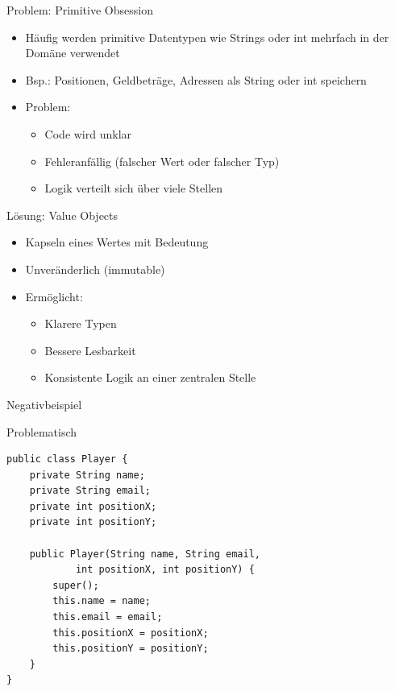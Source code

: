 \begin{frame}{Problem: Primitive Obsession}
    \begin{itemize}
        \item Häufig werden primitive Datentypen wie Strings oder int mehrfach in der Domäne verwendet
        \item Bsp.: Positionen, Geldbeträge, Adressen als String oder int speichern
        \item Problem:
        \begin{itemize}
            \item Code wird unklar
            \item Fehleranfällig (falscher Wert oder falscher Typ)
            \item Logik verteilt sich über viele Stellen
        \end{itemize}
    \end{itemize}
\end{frame}

\begin{frame}{Lösung: Value Objects}
    \begin{itemize}
        \item Kapseln eines Wertes mit Bedeutung
        \item Unveränderlich (immutable)
        \item Ermöglicht:
        \begin{itemize}
            \item Klarere Typen
            \item Bessere Lesbarkeit
            \item Konsistente Logik an einer zentralen Stelle
        \end{itemize}
    \end{itemize}
\end{frame}

\begin{frame}[fragile]{Negativbeispiel}
    \begin{alertblock}{Problematisch}
    	\begin{lstlisting}
public class Player {
	private String name;
	private String email;
	private int positionX;
	private int positionY;
	
	public Player(String name, String email, 
			int positionX, int positionY) {
		super();
		this.name = name;
		this.email = email;
		this.positionX = positionX;
		this.positionY = positionY;
	}
}    	
    	\end{lstlisting}
    \end{alertblock}
\end{frame}
